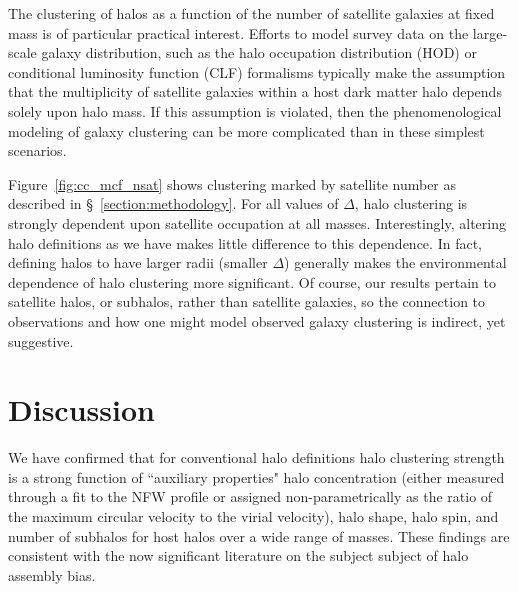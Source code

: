 \documentclass[usenatbib]{mnras}
\begin{document}
The clustering of halos as a function of the number of satellite galaxies at fixed mass is of 
particular practical interest. Efforts to model survey data on the large-scale galaxy distribution, 
such as the halo occupation distribution (HOD) or conditional luminosity function (CLF) formalisms 
typically make the assumption that the multiplicity of satellite galaxies within a host dark matter 
halo depends solely upon halo mass. If this assumption is violated, then the phenomenological 
modeling of galaxy clustering can be more complicated than in these simplest scenarios.

Figure~\ref{fig:cc_mcf_nsat} shows clustering marked by satellite number as described in 
\S~\ref{section:methodology}. For all values of $\Delta$, halo clustering is strongly dependent 
upon satellite occupation at all masses. Interestingly, altering halo definitions as we have 
makes little difference to this dependence. In fact, defining halos to have larger radii (smaller 
$\Delta$) generally makes the environmental dependence of halo clustering more 
significant. Of course, our results pertain to satellite halos, or subhalos, rather than 
satellite galaxies, so the connection to observations and how one might 
model observed galaxy clustering is indirect, yet suggestive. 


\section{Discussion}
\label{section:discussion}


We have confirmed that for conventional halo definitions 
halo clustering strength is a strong function of ``auxiliary properties" halo concentration (either measured
through a fit to the NFW profile or assigned non-parametrically as the ratio of the maximum circular velocity to
the virial velocity), halo shape, halo spin, and number of subhalos 
for host halos over a wide range of masses. These findings are consistent 
with the now significant literature on the subject subject of halo assembly bias. \citep{peacock_smith00, wechsler_etal02,
sheth_tormen04, gao_etal05, zentner_etal05, allgood_etal06, harker_etal06, wechsler_etal06, croton_etal07, dalal_etal08, mao_etal15, sunayama_etal16}
\end{document}
